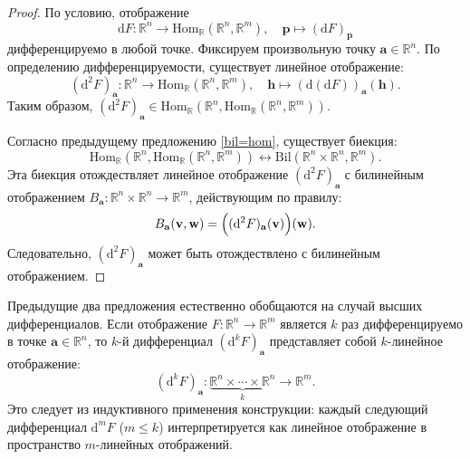 \begin{proof}
    По условию, отображение
    \[
        \mathrm{d}F: \mathbb{R}^n \to \mathrm{Hom}_{\mathbb{R}}(\mathbb{R}^n, \mathbb{R}^m), \quad \mathbf{p} \mapsto (\mathrm{d}F)_{\mathbf{p}}
    \]
    дифференцируемо в любой точке. Фиксируем произвольную точку $\mathbf{a} \in \mathbb{R}^n$. 
    По определению дифференцируемости, существует линейное отображение:
    \[
        (\mathrm{d}^2F)_{\mathbf{a}}: \mathbb{R}^n \to \mathrm{Hom}_{\mathbb{R}}(\mathbb{R}^n, \mathbb{R}^m), 
        \quad \mathbf{h} \mapsto (\mathrm{d}(\mathrm{d}F))_{\mathbf{a}}(\mathbf{h}).
    \]
    Таким образом, $(\mathrm{d}^2F)_{\mathbf{a}} \in \mathrm{Hom}_{\mathbb{R}}\left(\mathbb{R}^n, \mathrm{Hom}_{\mathbb{R}}(\mathbb{R}^n, \mathbb{R}^m)\right)$.
    
    Согласно предыдущему предложению \ref{bil=hom}, существует биекция:
    \[
        \mathrm{Hom}_{\mathbb{R}}\left(\mathbb{R}^n, \mathrm{Hom}_{\mathbb{R}}(\mathbb{R}^n, \mathbb{R}^m)\right) 
        \longleftrightarrow \mathrm{Bil}(\mathbb{R}^n \times \mathbb{R}^n, \mathbb{R}^m).
    \]
    Эта биекция отождествляет линейное отображение $(\mathrm{d}^2F)_{\mathbf{a}}$ с билинейным отображением 
    $B_{\mathbf{a}}: \mathbb{R}^n \times \mathbb{R}^n \to \mathbb{R}^m$, действующим по правилу:
    \[
        B_{\mathbf{a}}(\mathbf{v}, \mathbf{w}) = \Bigl( (\mathrm{d}^2F)_{\mathbf{a}}(\mathbf{v}) \Bigr)(\mathbf{w}).
    \]
    Следовательно, $(\mathrm{d}^2F)_{\mathbf{a}}$ может быть отождествлено с билинейным отображением.
\end{proof}

\begin{remark}
    Предыдущие два предложения естественно обобщаются на случай высших дифференциалов. 
    Если отображение $F:\mathbb{R}^n \to \mathbb{R}^m$ является $k$ раз дифференцируемо в точке $\mathbf{a} \in \mathbb{R}^n$, 
    то $k$-й дифференциал $(\mathrm{d}^kF)_{\mathbf{a}}$ представляет собой $k$-линейное отображение:
    \[
    (\mathrm{d}^kF)_{\mathbf{a}}: \underbrace{\mathbb{R}^n \times \cdots \times \mathbb{R}^n}_{k} \to \mathbb{R}^m.
    \]
    Это следует из индуктивного применения конструкции: каждый следующий дифференциал 
    $\mathrm{d}^{m}F$ ($m \leq k$) интерпретируется как линейное отображение в пространство $m$-линейных отображений.
\end{remark}






